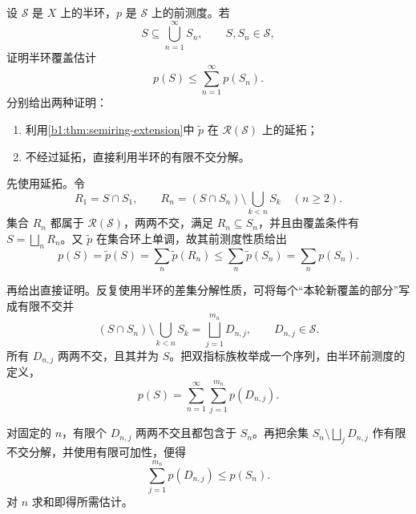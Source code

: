 \begin{exercise}
\label{b1:ex:0212}
设 \(\mathcal S\) 是 \(X\) 上的半环，\(p\) 是 \(\mathcal S\) 上的前测度。若
\[
S\subseteq\bigcup_{n=1}^{\infty}S_n,
\qquad S,S_n\in\mathcal S,
\]
证明半环覆盖估计
\[
p(S)\leq\sum_{n=1}^{\infty}p(S_n).
\]
分别给出两种证明：
\begin{enumerate}
  \item 利用\cref{b1:thm:semiring-extension}中 \(\widetilde p\) 在 \(\mathcal R(\mathcal S)\) 上的延拓；
  \item 不经过延拓，直接利用半环的有限不交分解。
\end{enumerate}
\end{exercise}
\begin{solution}
先使用延拓。令
\[
R_1=S\cap S_1,
\qquad
R_n=(S\cap S_n)\setminus\bigcup_{k<n}S_k
\quad(n\geq2).
\]
集合 \(R_n\) 都属于 \(\mathcal R(\mathcal S)\)，两两不交，满足 \(R_n\subseteq S_n\)，并且由覆盖条件有 \(S=\bigsqcup_nR_n\)。又 \(\widetilde p\) 在集合环上单调，故其前测度性质给出
\[
p(S)=\widetilde p(S)
=\sum_n\widetilde p(R_n)
\leq\sum_n\widetilde p(S_n)
=\sum_n p(S_n).
\]

再给出直接证明。反复使用半环的差集分解性质，可将每个“本轮新覆盖的部分”写成有限不交并
\[
\left(S\cap S_n\right)\setminus\bigcup_{k<n}S_k
=\bigsqcup_{j=1}^{m_n}D_{n,j},
\qquad D_{n,j}\in\mathcal S.
\]
所有 \(D_{n,j}\) 两两不交，且其并为 \(S\)。把双指标族枚举成一个序列，由半环前测度的定义，
\[
p(S)=\sum_{n=1}^{\infty}\sum_{j=1}^{m_n}p(D_{n,j}).
\]

对固定的 \(n\)，有限个 \(D_{n,j}\) 两两不交且都包含于 \(S_n\)。再把余集 \(S_n\setminus\bigsqcup_jD_{n,j}\) 作有限不交分解，并使用有限可加性，便得
\[
\sum_{j=1}^{m_n}p(D_{n,j})\leq p(S_n).
\]
对 \(n\) 求和即得所需估计。
\end{solution}
